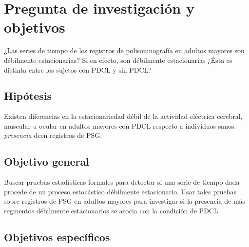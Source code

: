 
\section*{Pregunta de investigación y objetivos}

¿Las series de tiempo de los registros de polisomnografía en adultos mayores son débilmente estacionarias?
%
Si en efecto, son débilmente estacionarias ¿Ésta es distinta entre los sujetos con PDCL y sin PDCL?


\subsection*{Hipótesis}

Existen diferencias en la estacionariedad débil de la actividad eléctrica cerebral, muscular u ocular en adultos mayores con PDCL respecto a 
individuos sanos. 
\textit{presencia} deen registros de PSG.


\subsection*{Objetivo general}

Buscar pruebas estadísticas formales para detectar si una serie de tiempo dada procede de un 
proceso estocástico débilmente estacionario.
%
Usar tales pruebas sobre registros de PSG en adultos mayores para investigar si la 
presencia de más segmentos débilmente estacionarios se asocia con la condición de PDCL.


\subsection*{Objetivos específicos}

